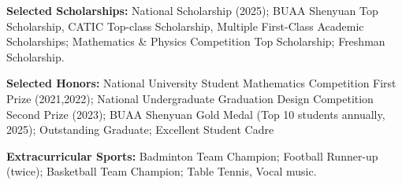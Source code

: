 \documentclass[a4paper,12pt]{article}
\begin{document}
\vspace{6pt}
\textbf{Selected Scholarships:} National Scholarship (2025); BUAA Shenyuan Top Scholarship, CATIC Top-class Scholarship, Multiple First-Class Academic Scholarships; Mathematics \& Physics Competition Top Scholarship; Freshman Scholarship.

\vspace{6pt}
\textbf{Selected Honors:} National University Student Mathematics Competition First Prize (2021,2022); National Undergraduate Graduation Design Competition Second Prize (2023); BUAA Shenyuan Gold Medal (Top 10 students annually, 2025); Outstanding Graduate; Excellent Student Cadre

\vspace{6pt}
\textbf{Extracurricular Sports:} Badminton Team Champion; Football Runner-up (twice); Basketball Team Champion; Table Tennis, Vocal music.


\end{document}
